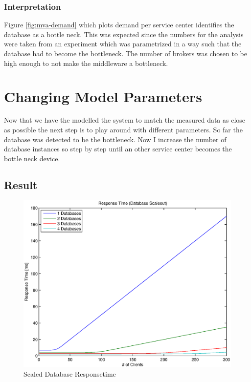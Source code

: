 \documentclass[a4paper]{article}
\begin{document}



\subsubsection{Interpretation}
Figure \ref{fig:mva-demand} which plots demand per service center identifies the database as a bottle neck. This was expected since the numbers for the analysis were taken from an experiment which was parametrized in a way such that the database had to become the bottleneck. The number of brokers was chosen to be high enough to not make the middleware a bottleneck.


\section{Changing Model Parameters}

Now that we have the modelled the system to match the measured data as close as possible the next step is to play around with different parameters. So far the  database was detected to be the bottleneck. Now I increase the number of database instances so step by step until an other service center becomes the bottle neck device.


\subsection{Result}


\begin{figure}[H]
	\begin{center}
    \includegraphics[scale=0.6]{../plots-ms2-mg/dbscaleout-rt.eps}
  \end{center}
  \caption{Scaled Database Responsetime}
  \label{fig:dbscaleout-rt}
\end{figure}
\end{document}

